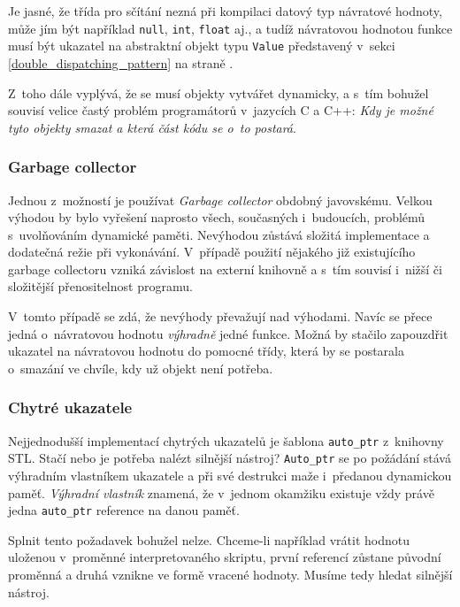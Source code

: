\documentclass[11pt,twoside,a4paper]{book}
\begin{document}
Je jasné, že třída pro sčítání nezná při kompilaci datový typ návratové hodnoty, může jím být například \texttt{null}, \texttt{int}, \texttt{float} aj., a tudíž návratovou hodnotou funkce musí být ukazatel na abstraktní objekt typu \texttt{Value} představený v~sekci \ref{double_dispatching_pattern} na straně \pageref{double_dispatching_pattern}.

Z~toho dále vyplývá, že se musí objekty vytvářet dynamicky, a s~tím bohužel souvisí velice častý problém programátorů v~jazycích C a C++: \textit{Kdy je možné tyto objekty smazat a která část kódu se o~to postará}.


\subsubsection{Garbage collector}

Jednou z~možností je používat \textit{Garbage collector} obdobný javovskému. Velkou výhodou by bylo vyřešení naprosto všech, současných i~budoucích, problémů s~u\-vol\-ňo\-vá\-ním dynamické paměti. Nevýhodou zůstává složitá implementace a dodatečná režie při vykonávání. V~případě použití nějakého již existujícího garbage collectoru vzniká závislost na externí knihovně a s~tím souvisí i~nižší či složitější přenositelnost programu.

V~tomto případě se zdá, že nevýhody převažují nad výhodami. Navíc se přece jedná o~ná\-vra\-to\-vou hodnotu \textit{výhradně} jedné funkce. Možná by stačilo zapouzdřit ukazatel na návratovou hodnotu do pomocné třídy, která by se postarala o~smazání ve chvíle, kdy už objekt není potřeba.


\subsubsection{Chytré ukazatele}
\label{chytre_ukazatele}

Nejjednodušší implementací chytrých ukazatelů je šablona \texttt{auto\_ptr} z~knihovny STL. Stačí nebo je potřeba nalézt silnější nástroj? \texttt{Auto\_ptr} se po požádání stává výhradním vlast\-ní\-kem ukazatele a při své destrukci maže i~předanou dynamickou paměť. \textit{Výhradní vlastník} znamená, že v~jednom okamžiku existuje vždy právě jedna \texttt{auto\_ptr} reference na danou paměť.

Splnit tento požadavek bohužel nelze. Chceme-li například vrátit hodnotu uloženou v~pro\-měn\-né interpretovaného skriptu, první referencí zůstane původní proměnná a druhá vznikne ve formě vracené hodnoty. Musíme tedy hledat silnější nástroj.
\end{document}
